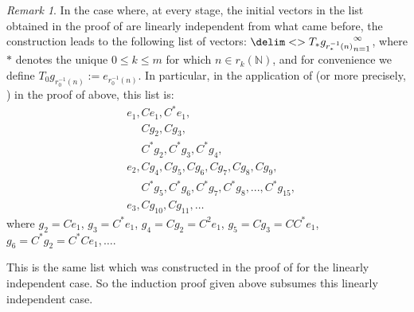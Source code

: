 \documentclass[10pt,reqno]{amsart}
\theoremstyle{remark}
\newtheorem{remark}[theorem]{Remark}
\newcommand{\seq}{\delim<>}
\numberwithin{equation}{section}
\begin{document}
\begin{remark}
  In the case where, at every stage, the initial vectors in the list obtained in the proof of  are linearly independent from what came before, the construction leads to the following list of vectors: $\seq{T_{*} g_{r_{*}^{-1}(n)}}_{n=1}^{\infty}$, where $*$ denotes the unique $0 \le k \le m$ for which $n \in r_k(\mathbb{N})$, and for convenience we define $T_0 g_{r_0^{-1}(n)} := e_{r_0^{-1}(n)}$.
  In particular, in the application of  (or more precisely, ) in the proof of  above, this list is:
  \begin{align*}
    &e_1,Ce_1,C^*e_1,\\
    &\phantom{e_1,}
      Cg_2,Cg_3,\\
    &\phantom{e_1,}C^*g_2,C^*g_3,C^*g_4,\\
    &e_2,Cg_4,Cg_5,Cg_6,Cg_7,Cg_8,Cg_9,\\
    &\phantom{e_1,} C^*g_5,C^*g_6,C^*g_7,C^*g_8,..., C^*g_{15},\\&
    e_3,Cg_{10},Cg_{11},\dots
  \end{align*}
  where $g_2 = Ce_1$, $g_3=C^*e_1$, $g_4=Cg_2=C^2 e_1$, $g_5=Cg_3=CC^*e_1$, $g_6=C^*g_2=C^*Ce_1, \dots$.

  This is the same list which was constructed in the proof of \cite[Theorem 20.8]{PPW-2020-TmloVLOt} for the linearly independent case.
  So the induction proof given above subsumes this linearly independent case.
\end{remark}
\end{document}
